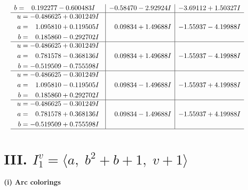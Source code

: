 \documentclass[1p]{elsarticle_modified}
\theoremstyle{definition}
\begin{document}
$$\begin{array}{c|c|c}
\begin{aligned}
b &= \phantom{-}0.192277 - 0.600483 I\end{aligned}
 & -0.58470 - 2.92924 I & -3.69112 + 1.50327 I \\ \hline\begin{aligned}
u &= -0.486625 + 0.301249 I \\
a &= \phantom{-}1.095810 + 0.119505 I \\
b &= \phantom{-}0.185860 - 0.292702 I\end{aligned}
 & \phantom{-}0.09834 + 1.49688 I & -1.55937 - 4.19988 I \\ \hline\begin{aligned}
u &= -0.486625 + 0.301249 I \\
a &= \phantom{-}0.781578 - 0.368136 I \\
b &= -0.519509 - 0.755598 I\end{aligned}
 & \phantom{-}0.09834 + 1.49688 I & -1.55937 - 4.19988 I \\ \hline\begin{aligned}
u &= -0.486625 - 0.301249 I \\
a &= \phantom{-}1.095810 - 0.119505 I \\
b &= \phantom{-}0.185860 + 0.292702 I\end{aligned}
 & \phantom{-}0.09834 - 1.49688 I & -1.55937 + 4.19988 I \\ \hline\begin{aligned}
u &= -0.486625 - 0.301249 I \\
a &= \phantom{-}0.781578 + 0.368136 I \\
b &= -0.519509 + 0.755598 I\end{aligned}
 & \phantom{-}0.09834 - 1.49688 I & -1.55937 + 4.19988 I\\
 \hline 
 \end{array}$$\newpage\newpage\renewcommand{\arraystretch}{1}
\centering \section*{III. $I^v_{1}= \langle a,\;b^2+b+1,\;v+1 \rangle$}
\flushleft \textbf{(i) Arc colorings}\\
\end{document}
